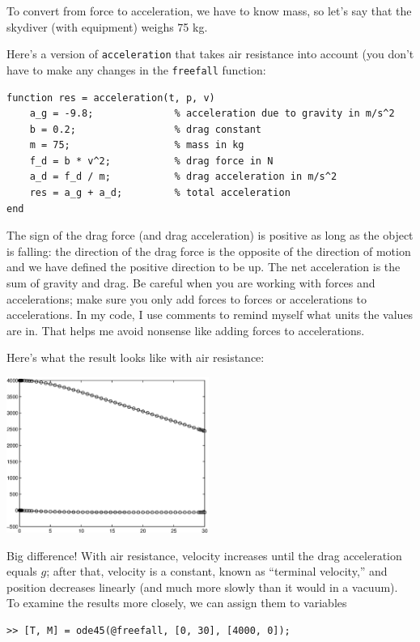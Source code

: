 \documentclass{book}
\begin{document}
To convert from force to acceleration, we have to know mass, so let's
say that the skydiver (with equipment) weighs 75 kg.

Here's a version of {\tt acceleration} that takes air resistance
into account (you don't have to make any changes in the {\tt freefall} function:

\begin{verbatim}
function res = acceleration(t, p, v)
    a_g = -9.8;              % acceleration due to gravity in m/s^2
    b = 0.2;                 % drag constant
    m = 75;                  % mass in kg
    f_d = b * v^2;           % drag force in N
    a_d = f_d / m;           % drag acceleration in m/s^2
    res = a_g + a_d;         % total acceleration
end
\end{verbatim}

The sign of the drag force (and drag acceleration) is positive as
long as the object is falling:  the direction of the drag force is
the opposite of the direction of motion and we have defined the
positive direction to be
up.
The net
acceleration is the sum of gravity and drag.  Be careful when you
are working with forces and accelerations; make sure you only add
forces to forces or accelerations to accelerations.  In my code,
I use comments to remind myself what units the values are in.
That helps me avoid nonsense like adding forces to accelerations.

Here's what the result looks like with air resistance:

\beforefig \centerline{\includegraphics[height=2in]{figs/freefall2.eps}}

Big difference!  With air resistance, velocity increases until
the drag acceleration equals $g$; after that, velocity is a constant,
known as ``terminal velocity,'' and position decreases linearly
(and much more slowly than it would in a vacuum).  To examine
the results more closely, we can assign them to variables


\begin{verbatim}
>> [T, M] = ode45(@freefall, [0, 30], [4000, 0]);
\end{verbatim}
\end{document}
